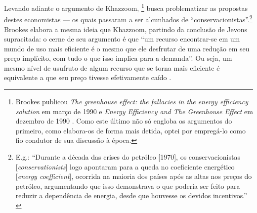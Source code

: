 Levando adiante o argumento de Khazzoom, \textcite{Brookes1990,Brookes1990a}\footnote{Brookes publicou \textit{The greenhouse effect: the fallacies in the energy efficiency solution} em março de 1990 \parencite{Brookes1990a} e \textit{Energy Efficiency and The Greenhouse Effect} em dezembro de 1990 \parencite{Brookes1990}. Como este último não só engloba os argumentos do primeiro, como elabora-os de forma mais detida, optei por empregá-lo como fio condutor de sua discussão à época.} busca problematizar as propostas destes economistas --- os quais passaram a ser alcunhados de ``conservacionistas''.\footnote{E.g.: ``Durante a década das crises do petróleo [1970], os conservacionistas [\textit{conservationists}] logo apontaram para a queda no coeficiente energético [\textit{energy coefficient}], ocorrida na maioria dos países após as altas nos preços do petróleo, argumentando que isso demonstrava o que poderia ser feito para reduzir a dependência de energia, desde que houvesse os devidos incentivos.'' \parencite[p. 321]{Brookes1990}} Brookes elabora a mesma ideia que Khazzoom, partindo da conclusão de Jevons supracitada: o cerne de seu argumento é que ``um recurso encontrar-se em um mundo de uso mais eficiente é o mesmo que ele desfrutar de uma redução em seu preço implícito, com tudo o que isso implica para a demanda''. Ou seja, um mesmo nível de usufruto de algum recurso que se torna mais eficiente é equivalente a que seu preço tivesse efetivamente caído \parencite[p. 319]{Brookes1990}. 


